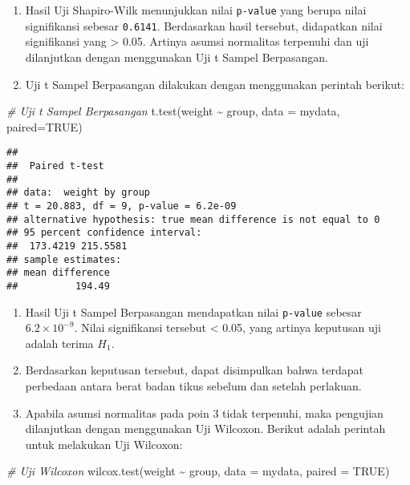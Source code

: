 \documentclass[
]{book}
\newenvironment{Shaded}{\begin{snugshade}}{\end{snugshade}}
\newcommand{\AttributeTok}[1]{\textcolor[rgb]{0.77,0.63,0.00}{#1}}
\newcommand{\CommentTok}[1]{\textcolor[rgb]{0.56,0.35,0.01}{\textit{#1}}}
\newcommand{\ConstantTok}[1]{\textcolor[rgb]{0.00,0.00,0.00}{#1}}
\newcommand{\FunctionTok}[1]{\textcolor[rgb]{0.00,0.00,0.00}{#1}}
\newcommand{\NormalTok}[1]{#1}
\newcommand{\SpecialCharTok}[1]{\textcolor[rgb]{0.00,0.00,0.00}{#1}}
\begin{document}
\begin{enumerate}
\def\labelenumi{\arabic{enumi}.}
\setcounter{enumi}{2}
\item
  Hasil Uji Shapiro-Wilk menunjukkan nilai \texttt{p-value} yang berupa nilai signifikansi sebesar \texttt{0.6141}. Berdasarkan hasil tersebut, didapatkan nilai signifikansi yang \textgreater{} 0.05. Artinya asumsi normalitas terpenuhi dan uji dilanjutkan dengan menggunakan Uji t Sampel Berpasangan.
\item
  Uji t Sampel Berpasangan dilakukan dengan menggunakan perintah berikut:
\end{enumerate}

\begin{Shaded}
\begin{Highlighting}[]
\CommentTok{\# Uji t Sampel Berpasangan}
\FunctionTok{t.test}\NormalTok{(weight }\SpecialCharTok{\textasciitilde{}}\NormalTok{ group, }\AttributeTok{data =}\NormalTok{ mydata, }\AttributeTok{paired=}\ConstantTok{TRUE}\NormalTok{)}
\end{Highlighting}
\end{Shaded}

\begin{verbatim}
## 
##  Paired t-test
## 
## data:  weight by group
## t = 20.883, df = 9, p-value = 6.2e-09
## alternative hypothesis: true mean difference is not equal to 0
## 95 percent confidence interval:
##  173.4219 215.5581
## sample estimates:
## mean difference 
##          194.49
\end{verbatim}

\begin{enumerate}
\def\labelenumi{\arabic{enumi}.}
\setcounter{enumi}{4}
\item
  Hasil Uji t Sampel Berpasangan mendapatkan nilai \texttt{p-value} sebesar \(6.2 \times 10^{-9}\). Nilai signifikansi tersebut \textless{} 0.05, yang artinya keputusan uji adalah terima \(H_1\).
\item
  Berdasarkan keputusan tersebut, dapat disimpulkan bahwa terdapat perbedaan antara berat badan tikus sebelum dan setelah perlakuan.
\item
  Apabila asumsi normalitas pada poin 3 tidak terpenuhi, maka pengujian dilanjutkan dengan menggunakan Uji Wilcoxon. Berikut adalah perintah untuk melakukan Uji Wilcoxon:
\end{enumerate}

\begin{Shaded}
\begin{Highlighting}[]
\CommentTok{\# Uji Wilcoxon}
\FunctionTok{wilcox.test}\NormalTok{(weight }\SpecialCharTok{\textasciitilde{}}\NormalTok{ group, }\AttributeTok{data =}\NormalTok{ mydata, }\AttributeTok{paired =} \ConstantTok{TRUE}\NormalTok{)}
\end{Highlighting}
\end{Shaded}
\end{document}
